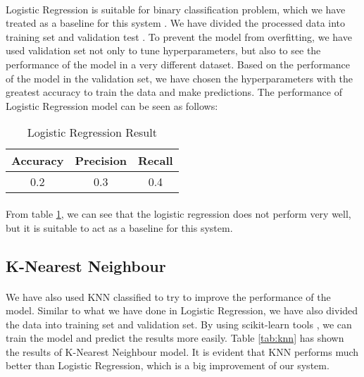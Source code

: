\documentclass[fleqn,11pt]{olplainarticle}
\begin{document}
\paragraph*{}
Logistic Regression is suitable for binary classification problem, which we have treated as a baseline for this system \citep{menard_lr}. We have divided the processed data into training set and validation test \citep{scikit-learn}. To prevent the model from overfitting, we have used validation set not only to tune hyperparameters, but also to see the performance of the model in a very different dataset. Based on the performance of the model in the validation set, we have chosen the hyperparameters with the greatest accuracy to train the data and make predictions. The performance of Logistic Regression model can be seen as follows:

\begin{table}[!htbp]
\centering
\caption{Logistic Regression Result}\label{tab:lr}
\begin{tabular}{ccc}
\toprule
Accuracy& Precision& Recall\\
\midrule
0.2& 0.3& 0.4\\%
\bottomrule
\end{tabular}
\end{table}
\paragraph*{}
From table \ref{tab:lr}, we can see that the logistic regression does not perform very well, but it is suitable to act as a baseline for this system.

\subsection{K-Nearest Neighbour}\label{knn}
\paragraph*{}
We have also used KNN classified to try to improve the performance of the model. Similar to what we have done in Logistic Regression, we have also divided the data into training set and validation set. By using scikit-learn tools \citep{scikit-learn}, we can train the model and predict the results more easily. Table \ref{tab:knn} has shown the results of K-Nearest Neighbour model. It is evident that KNN performs much better than Logistic Regression, which is a big improvement of our system.
\end{document}
